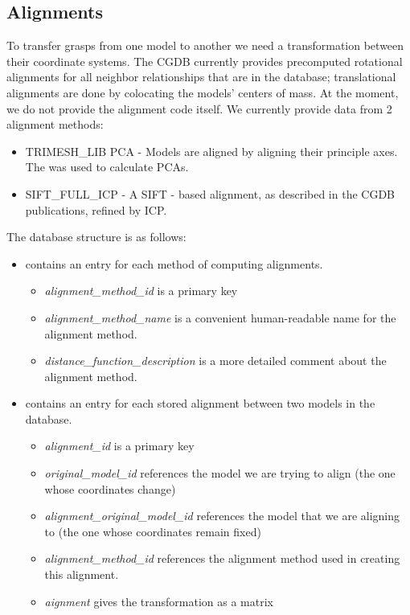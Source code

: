\subsection{Alignments}
To transfer grasps from one model to another we need a transformation
between their coordinate systems. The CGDB currently provides
precomputed rotational alignments for all neighbor relationships that
are in the database; translational alignments are done by colocating
the models' centers of mass. At the moment, we do not provide the
alignment code itself. We currently provide data from 2 alignment
methods:
\begin{itemize}
	\item TRIMESH\_LIB PCA - Models are aligned by aligning their
      principle axes. The  was
      used to calculate PCAs.
	\item SIFT\_FULL\_ICP - A SIFT - based alignment, as described in
      the CGDB publications, refined by ICP.
\end{itemize}

The database structure is as follows:
\begin{itemize}
	\item {} contains an entry for each method
      of computing alignments.
		\begin{itemize}
			\item \emph{alignment\_method\_id} is a primary key
			\item \emph{alignment\_method\_name} is a convenient
              human-readable name for the alignment method.
			\item \emph{distance\_function\_description} is a more
              detailed comment about the alignment method.
		\end{itemize}
	\item {} contains an entry for each stored
      alignment between two models in the database.
		\begin{itemize}
			\item \emph{alignment\_id} is a primary key
			\item \emph{original\_model\_id} references the model we
              are trying to align (the one whose coordinates change)
			\item \emph{alignment\_original\_model\_id} references the
              model that we are aligning to (the one whose coordinates
              remain fixed)
			\item \emph{alignment\_method\_id} references the
              alignment method used in creating this alignment.
			\item \emph{aignment} gives the transformation as a matrix
		\end{itemize}
\end{itemize}


